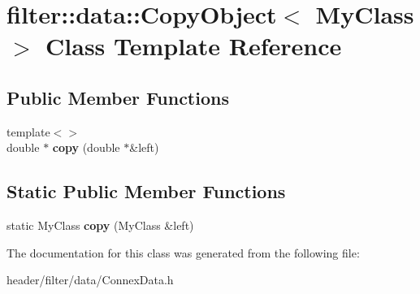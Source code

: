 \hypertarget{classfilter_1_1data_1_1_copy_object}{}\section{filter\+:\+:data\+:\+:Copy\+Object$<$ My\+Class $>$ Class Template Reference}
\label{classfilter_1_1data_1_1_copy_object}
\subsection*{Public Member Functions}
\begin{DoxyCompactItemize}
\item 
\mbox{\label{classfilter_1_1data_1_1_copy_object_a8c66b211a6a1b5bdc8cab5a7855cbf33}} 
{\footnotesize template$<$$>$ }\\double $\ast$ {\bfseries copy} (double $\ast$\&left)
\end{DoxyCompactItemize}
\subsection*{Static Public Member Functions}
\begin{DoxyCompactItemize}
\item 
\mbox{\label{classfilter_1_1data_1_1_copy_object_ad24997fa56580b4a999e5baa9e42e3b6}} 
static My\+Class {\bfseries copy} (My\+Class \&left)
\end{DoxyCompactItemize}


The documentation for this class was generated from the following file\+:\begin{DoxyCompactItemize}
\item 
header/filter/data/Connex\+Data.\+h\end{DoxyCompactItemize}
